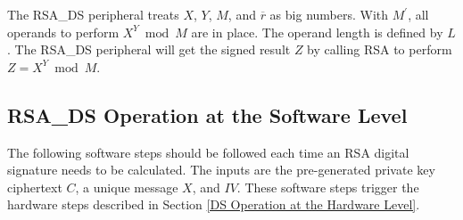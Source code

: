 \documentclass[main\_\_EN.tex]{subfiles}
\begin{document}
\begin{enumerate}
The RSA\_DS peripheral treats \begin{math}X\end{math},
            \begin{math}Y\end{math},
            \begin{math}M\end{math}, and
            \begin{math}\overline{r}\end{math} as big numbers. With
            \begin{math}M^{\prime}\end{math}, all operands to perform \begin{math} X^{Y} \bmod M\end{math} are in place. The operand length is defined by \begin{math}L\end{math}.
        The RSA\_DS peripheral will get the signed result \begin{math}Z\end{math} by calling RSA to perform \begin{math}Z = X^{Y} \bmod M\end{math}.

\end{enumerate}


\subsection{RSA\_DS Operation at the Software Level}

The following software steps should be followed each time an RSA digital signature needs to be calculated. The inputs are the pre-generated private key ciphertext \begin{math}C\end{math}, a unique message \begin{math}X\end{math}, and \begin{math}IV\end{math}. These software steps trigger the hardware steps described in Section \ref{DS Operation at the Hardware Level}.
\end{document}
